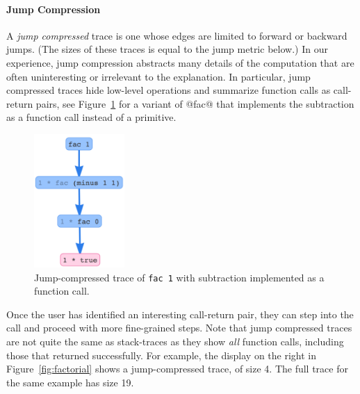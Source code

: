 \paragraph{Jump Compression}
%
A \emph{jump compressed} trace is one whose edges are limited to forward
or backward jumps. (The sizes of these traces is equal to the jump
metric below.)
%
In our experience, jump compression abstracts many details of the
computation that are often uninteresting or irrelevant to the
explanation.
% 
In particular, jump compressed traces hide low-level operations and
summarize function calls as call-return pairs, see
Figure~\ref{fig:fac-jump} for a variant of @fac@ that implements the
subtraction as a function call instead of a primitive.
%
\begin{figure}[t]
\centering
\includegraphics[height=2in]{fac-minus.png}
\caption{Jump-compressed trace of \texttt{fac 1} with subtraction
  implemented as a function call.}
\label{fig:fac-jump}
\end{figure}
%
Once the user has identified an interesting call-return pair, they can
step into the call and proceed with more fine-grained steps.
%
%
Note that jump compressed traces are not quite the same as
stack-traces as they show \emph{all} function calls, including
those that returned successfully.
%
For example, the display on the right in Figure~\ref{fig:factorial} shows
a jump-compressed trace, of size 4. The full trace for
the same example has size 19.


